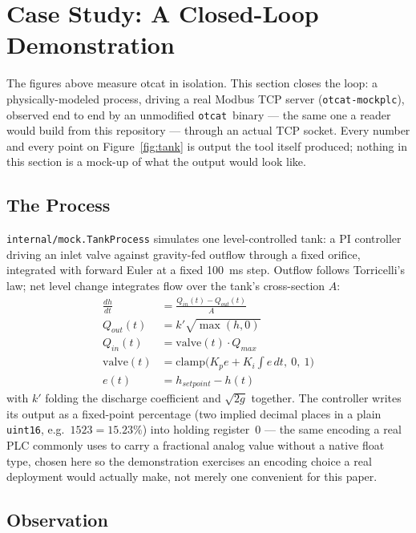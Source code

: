 \documentclass[10pt,conference]{IEEEtran}
\newcommand{\otcat}{\texttt{otcat}}
\newcommand{\code}[1]{\texttt{#1}}
\begin{document}
\section{Case Study: A Closed-Loop Demonstration}
\label{sec:case-study}

The figures above measure otcat in isolation. This section closes the
loop: a physically-modeled process, driving a real Modbus TCP server
(\code{otcat-mockplc}), observed end to end by an unmodified \otcat\
binary --- the same one a reader would build from this repository ---
through an actual TCP socket. Every number and every point on
Figure~\ref{fig:tank} is output the tool itself produced; nothing in
this section is a mock-up of what the output would look like.

\subsection{The Process}

\code{internal/mock.TankProcess} simulates one level-controlled tank: a
PI controller driving an inlet valve against gravity-fed outflow
through a fixed orifice, integrated with forward Euler at a fixed
100~ms step. Outflow follows Torricelli's law; net level change
integrates flow over the tank's cross-section \(A\):
\begin{align}
\frac{dh}{dt} &= \frac{Q_{in}(t) - Q_{out}(t)}{A} \\
Q_{out}(t) &= k' \sqrt{\max(h, 0)} \\
Q_{in}(t) &= \mathrm{valve}(t) \cdot Q_{max} \\
\mathrm{valve}(t) &= \mathrm{clamp}\bigl(K_p e + K_i \!\!\int\!\! e\, dt,\ 0,\ 1\bigr) \\
e(t) &= h_{setpoint} - h(t)
\end{align}
with \(k'\) folding the discharge coefficient and \(\sqrt{2g}\)
together. The controller writes its output as a fixed-point percentage
(two implied decimal places in a plain \code{uint16}, e.g.\ \(1523 =
15.23\%\)) into holding register~0 --- the same encoding a real PLC
commonly uses to carry a fractional analog value without a native
float type, chosen here so the demonstration exercises an encoding
choice a real deployment would actually make, not merely one convenient
for this paper.

\subsection{Observation}
\end{document}
